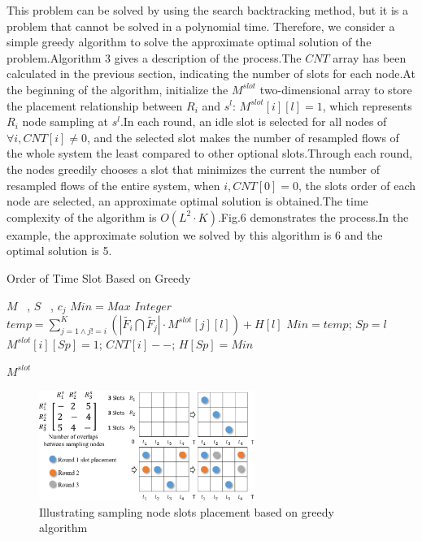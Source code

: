 \documentclass[conference]{IEEEtran}
\begin{document}
This problem can be solved by using the search backtracking method, but it is a problem that cannot be solved in a polynomial time. Therefore, we consider a simple greedy algorithm to solve the approximate optimal solution of the problem.Algorithm 3 gives a description of the process.The $CNT$ array has been calculated in the previous section, indicating the number of slots for each node.At the beginning of the algorithm, initialize the $M^{slot}$ two-dimensional array to store the placement relationship between $R_i$ and $s^l$: $M^{slot}[i][l]=1$, which represents $R_i$ node sampling at $s^l$.In each round, an idle slot is selected for all nodes of $\forall i, CNT[i]\neq 0$, and the selected slot makes the number of resampled flows of the whole system the least compared to other optional slots.Through each round, the nodes greedily chooses a slot that minimizes the current the number of resampled flows of the entire system, when $i, CNT[0]=0$, the slots order of each node are selected, an approximate optimal solution is obtained.The time complexity of the algorithm is $O(L^2 \cdot K)$.Fig.6 demonstrates the process.In the example, the approximate solution we solved by this algorithm is 6 and the optimal solution is 5.
\begin{algorithm}[h]
\caption{Order of Time Slot Based on Greedy}
\begin{algorithmic}[1]
\REQUIRE  $M$ ~, $S$ ~, $c_j$
\STATE $Min = Max$ $Integer$
\STATE $temp = \sum^{K}_{j=1 \wedge j != i}(\left| \widetilde{{{F}_{i}}}\bigcap \widetilde{{{F}_{j}}} \right| \cdot M^{slot}[j][l]) + H[l] $
\STATE $Min = temp$; $Sp = l$ 
\ENDIF
\ENDIF
\ENDFOR
\STATE$M^{slot}[i][Sp] = 1$; $ CNT[i]--$; $H[Sp] = Min$
\ENDIF
\ENDFOR
\ENDWHILE

\RETURN $M^{slot}$
\label{code:recentEnd}
\end{algorithmic}
\end{algorithm}

\begin{figure}[!hhhhhhhhhht]
\centering
\includegraphics[width=7cm]{images/greedy_for_order_slot.png}
\caption{Illustrating sampling node slots placement based on greedy algorithm}
\label{slot_order}
\end{figure}
\end{document}
